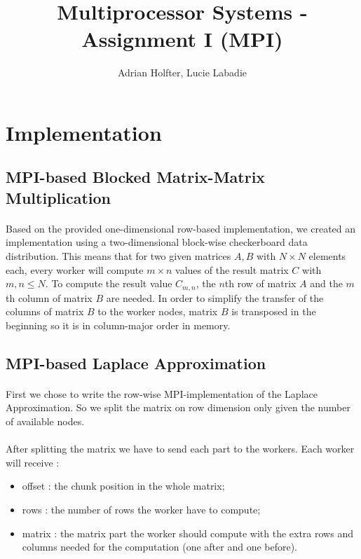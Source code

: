 \documentclass[]{article}
\title{Multiprocessor Systems - Assignment I (MPI)}
\author{Adrian Holfter, Lucie Labadie}
\begin{document}
\maketitle

\section{Implementation}

\subsection{MPI-based Blocked Matrix-Matrix Multiplication}

\paragraph{} Based on the provided one-dimensional row-based implementation, we created an implementation using a two-dimensional block-wise checkerboard data distribution. This means that for two given matrices $A,B$ with $N \times N$ elements each, every worker will compute $m \times n$ values of the result matrix $C$ with $m,n \leq N$.
To compute the result value $C_{m,n}$, the $n$th row of matrix $A$ and the $m$th column of matrix $B$ are needed.
In order to simplify the transfer of the columns of matrix $B$ to the worker nodes, matrix $B$ is transposed in the beginning so it is in column-major order in memory.

\subsection{MPI-based Laplace Approximation}

\paragraph{} First we chose to write the row-wise MPI-implementation of the Laplace Approximation. So we split the matrix on row dimension only given the number of available nodes.
\paragraph{} After splitting the matrix we have to send each part to the workers. Each worker will receive : 
\begin{itemize}
	\item offset : the chunk position in the whole matrix; 
	\item rows : the number of rows the worker have to compute;
	\item matrix : the matrix part the worker should compute with the extra rows and columns needed for the computation (one after and one before). 
\end{itemize}
\end{document}
